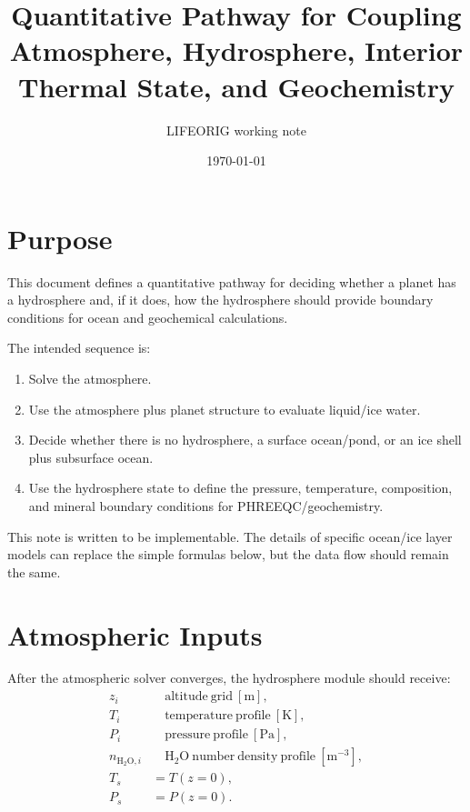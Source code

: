 \documentclass[11pt]{article}
\title{Quantitative Pathway for Coupling Atmosphere, Hydrosphere, Interior Thermal State, and Geochemistry}
\author{LIFEORIG working note}
\date{\today}
\begin{document}
\maketitle

\section{Purpose}

This document defines a quantitative pathway for deciding whether a planet has
a hydrosphere and, if it does, how the hydrosphere should provide boundary
conditions for ocean and geochemical calculations.

The intended sequence is:
\begin{enumerate}
    \item Solve the atmosphere.
    \item Use the atmosphere plus planet structure to evaluate liquid/ice water.
    \item Decide whether there is no hydrosphere, a surface ocean/pond, or an
    ice shell plus subsurface ocean.
    \item Use the hydrosphere state to define the pressure, temperature,
    composition, and mineral boundary conditions for PHREEQC/geochemistry.
\end{enumerate}

This note is written to be implementable. The details of specific ocean/ice
layer models can replace the simple formulas below, but the data flow should
remain the same.

\section{Atmospheric Inputs}

After the atmospheric solver converges, the hydrosphere module should receive:
\begin{align}
    z_i               &\quad \mathrm{altitude\ grid}\ [\mathrm{m}], \\
    T_i               &\quad \mathrm{temperature\ profile}\ [\mathrm{K}], \\
    P_i               &\quad \mathrm{pressure\ profile}\ [\mathrm{Pa}], \\
    n_{\mathrm{H_2O},i} &\quad \mathrm{H_2O\ number\ density\ profile}\ [\mathrm{m^{-3}}], \\
    T_s               &= T(z=0), \\
    P_s               &= P(z=0).
\end{align}
\end{document}
